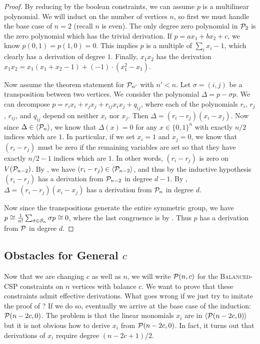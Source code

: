 \begin{proof}
By reducing by the boolean constraints, we can assume $p$ is a multilinear polynomial. 
We will induct on the number of vertices $n$, so first we must handle the base case of $n = 2$ (recall $n$ is even). 
The only degree zero polynomial in $\mathcal P_2$ is the zero polynomial which has the trivial derivation. 
If $p = ax_1 + bx_2 + c$, we know $p(0,1) = p(1,0) = 0$. This implies $p$ is a multiple of $\sum_i x_i - 1$, which clearly has a derivation of degree $1$.
Finally, $x_1x_2$ has the derivation $x_1x_2 = x_1(x_1+x_2-1) + (-1)\cdot(x_1^2 - x_1)$.

Now assume the theorem statement for $\mathcal P_{n'}$ with $n' < n$. 
Let $\sigma = (i,j)$ be a transposition between two vertices. 
We consider the polynomial $\Delta = p - \sigma p$. 
We can decompose $p = r_i x_i + r_j x_j + r_{ij} x_ix_j + q_{ij}$, where each of the polynomials $r_i$, $r_j$, $r_{ij}$, and $q_{ij}$ depend on neither $x_i$ nor $x_j$. Then $\Delta = (r_i - r_j)(x_i - x_j)$. Now since $\Delta \in \langle \mathcal P_n \rangle$, we know that $\Delta(x) = 0$ for any $x \in \{0,1\}^n$ with exactly $n/2$ indices which are $1$. In particular, if we set $x_i = 1$ and $x_j = 0$, we know that $(r_i - r_j)$ must be zero if the remaining variables are set so that they have exactly $n/2 - 1$ indices which are $1$. In other words, $(r_i - r_j)$ is zero on $V(\mathcal P_{n-2})$. By , we have $(r_i - r_j) \in \langle \mathcal P_{n-2} \rangle$, and thus by the inductive hypothesis $(r_i - r_j)$ has a derivation from $\mathcal P_{n-2}$ in degree $d-1$. By , $\Delta = (r_i - r_j)(x_i - x_j)$ has a derivation from $\mathcal P_n$ in degree $d$. 

Now since the transpositions generate the entire symmetric group, we have $p \cong \frac{1}{n!} \sum_{\sigma \in \mathcal S_n} \sigma p \cong 0$, where the last congruence is by . Thus $p$ has a derivation from $\mathcal P$ in degree $d$. 
\end{proof}

\subsection{Obstacles for General $c$}
Now that we are changing $c$ as well as $n$, we will write $\mathcal P(n,c)$ for the \textsc{Balanced-CSP} constraints on $n$ vertices with balance $c$.
We want to prove that these constraints admit effective derivations.
What goes wrong if we just try to imitate the proof of ?
If we do so, eventually we arrive at the base case of the induction: $\mathcal P(n-2c,0)$.
The problem is that the linear monomials $x_i$ are in $\langle \mathcal P(n-2c,0) \rangle$ but it is not obvious how to derive $x_i$ from $\mathcal P(n-2c,0)$. 
In fact, it turns out that derivations of $x_i$ require degree $(n-2c+1)/2$. 

